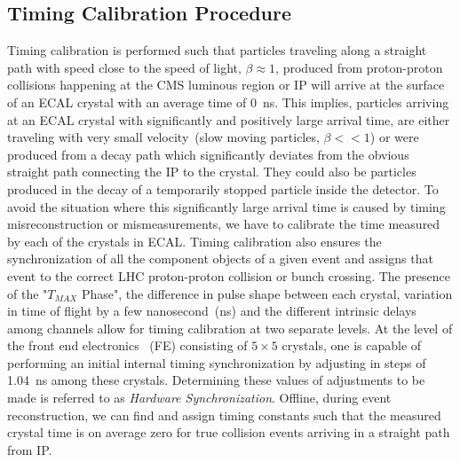 \subsection{Timing Calibration Procedure}
Timing calibration is performed such that particles traveling along a straight path with speed close to the speed of light, $\beta \approx 1$, produced from proton-proton collisions happening at the CMS luminous region or IP will arrive at the surface of an ECAL crystal  with an average time of 0~ns. This implies, particles arriving at an ECAL crystal with significantly and positively large arrival time, are either traveling with very small velocity~(slow moving particles, $\beta << 1$) or were produced from a decay path which significantly deviates from the obvious straight path connecting the IP to the crystal. They could also be particles produced in the decay of a temporarily stopped particle inside the detector. To avoid the situation where this significantly large arrival time is caused by timing misreconstruction or mismeasurements, we have to calibrate the time measured by each of the \pb crystals in ECAL. Timing calibration also ensures the synchronization of all the component objects of a given event and assigns that event to the correct LHC proton-proton collision or bunch crossing.
The presence of the "$T_{MAX}$ Phase", the difference in pulse shape between each crystal, variation in time of flight by a few nanosecond~(ns) and the different intrinsic delays among channels allow for timing calibration at two separate levels.
At the level of the front end electronics ~(FE) consisting of $5\times5$ crystals, one is capable of performing an initial internal timing synchronization by adjusting in steps of 1.04~ns among these crystals. Determining these values of adjustments to be made is referred to as \textit{Hardware Synchronization}. Offline, during event reconstruction, we can find and assign timing constants such that the measured crystal time is on average zero for true collision events arriving in a straight path from IP.


